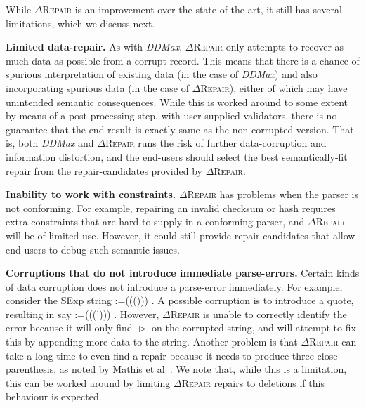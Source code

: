 \documentclass[acmsmall,screen,review,anonymous]{acmart}
\makeatletter
\newcommand{\revise}[1]{\textcolor{black}{#1}}
\def\Rincomplete{\texttt{\color{incompletecolor}\textbf{$\vartriangleright$}}\xspace}
\newcommand{\approach}{\textsc{$\Delta$Repair}\xspace}
\newcommand{\ddmax}{\textit{DDMax}\xspace}
\newcommand{\drepair}{\approach}
\newcommand\letterboxed[1]{%
\setlength{\fboxsep}{0pt}%
  \@tfor\@ii:=#1\do{%
    \fcolorbox{light-gray}{white}%
    {\texttt{\strut\@ii}}%
  }%
}
\makeatother
\begin{document}
While \drepair is an improvement over the state of the art, it still has
several limitations, which we discuss next.


\noindent\textbf{Limited data-repair.} As with \ddmax, \drepair only attempts
to recover as much data as possible from a corrupt record. This means that there
is a chance of spurious interpretation of existing data (in the case of \ddmax)
and also incorporating spurious data (in the case of \drepair), either of which
may have unintended semantic consequences. While this is
worked around to some extent by means of a post processing step, with user
supplied validators, there is no guarantee that the end result is exactly same
as the non-corrupted version. That is, both \ddmax and \drepair runs the risk
of further data-corruption and information distortion, and the end-users should
select the best semantically-fit repair from the repair-candidates provided by
\drepair.

\noindent\textbf{Inability to work with constraints.} \drepair has problems when
the parser is not conforming. For example, repairing an invalid checksum or hash
requires extra constraints that are hard to supply in a conforming parser,
and \drepair will be of limited use. However, it could still provide
repair-candidates that allow end-users to debug such semantic issues. 

\noindent\textbf{Corruptions that do not introduce immediate parse-errors.}
Certain kinds of data corruption does not introduce a parse-error immediately.
For example, consider the SExp string \letterboxed{((()))}. A possible corruption
is to introduce a quote, resulting in say \letterboxed{(((')))}.
However, \drepair is unable to correctly identify the error because it will
only find \Rincomplete on the corrupted string, and will attempt to fix this
by appending more data to the string. Another problem is that \drepair can take
a long time to even find a repair because it needs to produce three close
parenthesis, as noted by Mathis et al~\cite{mathis2019parser}.
We note that, while this is a limitation, this can be worked around by limiting
\drepair repairs to deletions if this behaviour is expected.
\end{document}
